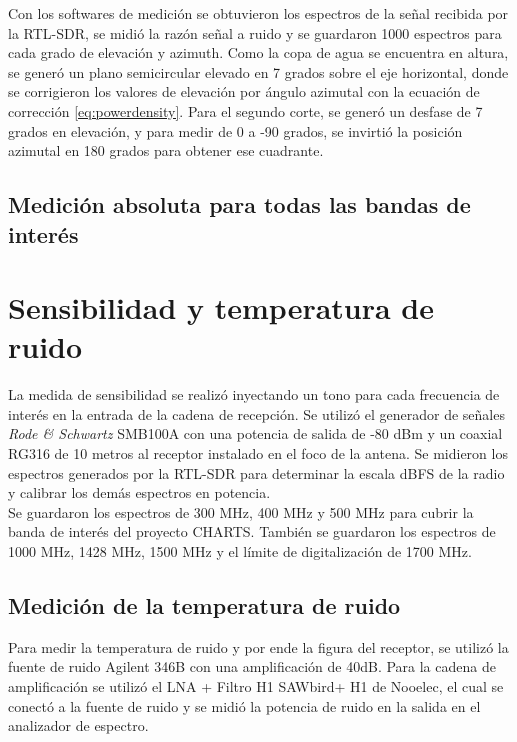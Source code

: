 Con los softwares de medición se obtuvieron los espectros de la señal recibida por la RTL-SDR, se midió la razón señal a ruido y se guardaron 1000 espectros para cada grado de elevación y azimuth. Como la copa de agua se encuentra en altura, se generó un plano semicircular elevado en 7 grados sobre el eje horizontal, donde se corrigieron los valores de elevación por ángulo azimutal con la ecuación de corrección \ref{eq:powerdensity}. Para el segundo corte, se generó un desfase de 7 grados en elevación, y para medir de 0 a -90 grados, se invirtió la posición azimutal en 180 grados para obtener ese cuadrante.\\

\subsection{Medición absoluta para todas las bandas de interés}

\section{Sensibilidad y temperatura de ruido}

La medida de sensibilidad se realizó inyectando un tono para cada frecuencia de interés en la entrada de la cadena de recepción. Se utilizó el generador de señales \textit{Rode \& Schwartz} SMB100A con una potencia de salida de -80 dBm y un coaxial RG316 de 10 metros al receptor instalado en el foco de la antena. Se midieron los espectros generados por la RTL-SDR para determinar la escala dBFS de la radio y calibrar los demás espectros en potencia.\\

Se guardaron los espectros de 300 MHz, 400 MHz y 500 MHz para cubrir la banda de interés del proyecto CHARTS. También se guardaron los espectros de 1000 MHz, 1428 MHz, 1500 MHz y el límite de digitalización de 1700 MHz.\\

\subsection{Medición de la temperatura de ruido}

Para medir la temperatura de ruido y por ende la figura del receptor, se utilizó la fuente de ruido Agilent 346B con una amplificación de 40dB. Para la cadena de amplificación se utilizó el LNA + Filtro H1 SAWbird+ H1 de Nooelec, el cual se conectó a la fuente de ruido y se midió la potencia de ruido en la salida en el analizador de espectro.\\

